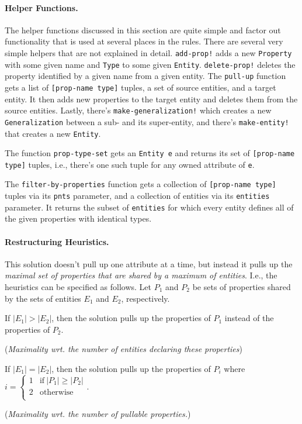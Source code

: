 \documentclass[submission]{eptcs}
\begin{document}
\paragraph{Helper Functions.}

The helper functions discussed in this section are quite simple and factor out
functionality that is used at several places in the rules.  There are several
very simple helpers that are not explained in detail.  \verb|add-prop!| adds a
new \verb|Property| with some given name and \verb|Type| to some given
\verb|Entity|.  \verb|delete-prop!| deletes the property identified by a given
name from a given entity.  The \verb|pull-up| function gets a list of
\verb|[prop-name type]| tuples, a set of source entities, and a target entity.
It then adds new properties to the target entity and deletes them from the
source entities.  Lastly, there's \verb|make-generalization!| which creates a
new \verb|Generalization| between a sub- and its super-entity, and there's
\verb|make-entity!| that creates a new \verb|Entity|.

The function \verb|prop-type-set| gets an \verb|Entity e| and returns its set
of \verb|[prop-name type]| tuples, i.e., there's one such tuple for any owned
attribute of \verb|e|.

The \verb|filter-by-properties| function gets a collection of
\verb|[prop-name type]| tuples via its \verb|pnts| parameter, and a collection
of entities via its \verb|entities| parameter.  It returns the subset of
\verb|entities| for which every entity defines all of the given properties with
identical types.



\paragraph{Restructuring Heuristics.}

This solution doesn't pull up one attribute at a time, but instead it pulls up
the \emph{maximal set of properties that are shared by a maximum of entities}.
I.e., the heuristics can be specified as follows.  Let $P_1$ and $P_2$ be sets
of properties shared by the sets of entities $E_1$ and $E_2$, respectively.

\begin{compactenum}
\item If $|E_1| > |E_2|$, then the solution pulls up the properties of $P_1$
  instead of the properties of $P_2$.

  (\emph{Maximality wrt. the number of entities declaring these properties})
\item If $|E_1| = |E_2|$, then the solution pulls up the properties of $P_i$
  where~$i = \left\{\begin{array}{ll}1 & \text{if}~|P_1| \geq |P_2|\\2 &
      \text{otherwise}\\ \end{array}\right.$.

  (\emph{Maximality wrt. the number of pullable properties.})
\end{compactenum}
\end{document}
